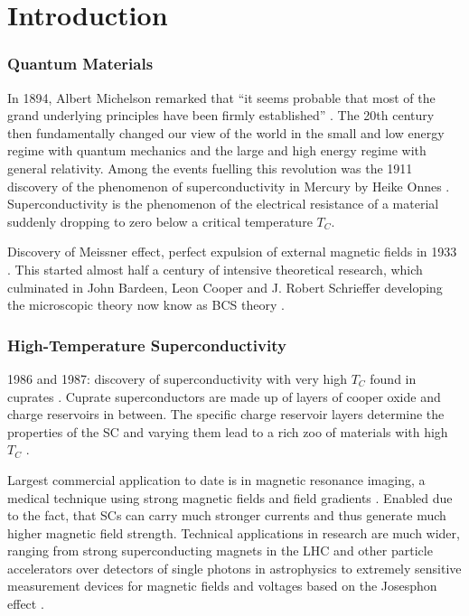 \documentclass[../notes.tex]{subfiles}
\begin{document}
\raggedbottom
	
\chapter{Introduction}

\subsection*{Quantum Materials}


In 1894, Albert Michelson remarked that \enquote{it seems probable that most of the grand underlying principles have been firmly established}  \cite[p. 159]{chicagoAnnualRegister1896}.
The 20th century then fundamentally changed our view of the world in the small and low energy regime with quantum mechanics and the large and high energy regime with general relativity.
Among the events fuelling this revolution was the 1911 discovery of the phenomenon of superconductivity in Mercury by Heike Onnes \cite{onnesFurtherExperimentsLiquid1991}.
Superconductivity is the phenomenon of the electrical resistance of a material suddenly dropping to zero below a critical temperature \(T_C\).

Discovery of Meissner effect, perfect expulsion of external magnetic fields in 1933 \cite{meissnerNeuerEffektBei1933}.
This started almost half a century of intensive theoretical research, which culminated in John Bardeen, Leon Cooper and J. Robert Schrieffer developing the microscopic theory now know as BCS theory \cite{bardeenTheorySuperconductivity1957}.

\subsection*{High-Temperature Superconductivity}

1986 and 1987: discovery of superconductivity with very high \(T_C\) found in cuprates \cite{bednorzPossibleHighTc1986,uchidaHighTcSuperconductivity1987}.
Cuprate superconductors are made up of layers of cooper oxide and charge reservoirs in between.
The specific charge reservoir layers determine the properties of the SC and varying them lead to a rich zoo of materials with high \(T_C\)  \cite{rybickiPerspectivePhaseDiagram2016}.

Largest commercial application to date is in magnetic resonance imaging, a medical technique using strong magnetic fields and field gradients \cite{rinckMagneticResonanceMedicine}.
Enabled due to the fact, that SCs can carry much stronger currents and thus generate much higher magnetic field strength.
Technical applications in research are much wider, ranging from strong superconducting magnets in the LHC \cite{tollestrupDevelopmentSuperconductingMagnets2008, rossiParticleAcceleratorsCuprate2023} and other particle accelerators over detectors of single photons in astrophysics \cite{irwinTransitionEdgeSensors2005} to extremely sensitive measurement devices for magnetic fields \cite{faleyHighTcSQUIDBiomagnetometers2017} and voltages \cite{klushinPresentFutureHightemperature2020} based on the Josesphon effect \cite{josephsonPossibleNewEffects1962}.
\end{document}
